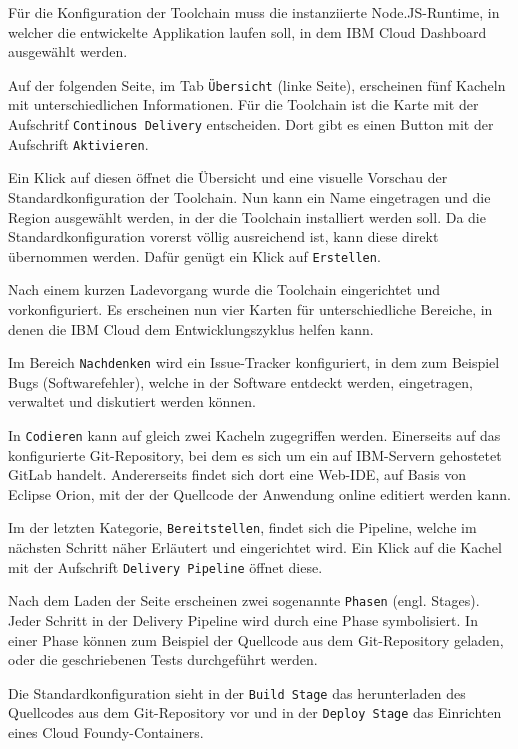 Für die Konfiguration der Toolchain muss die instanziierte Node.JS-Runtime, in welcher die entwickelte Applikation laufen
soll, in dem IBM Cloud Dashboard ausgewählt werden.

Auf der folgenden Seite, im Tab \texttt{Übersicht} (linke Seite), erscheinen fünf Kacheln mit unterschiedlichen Informationen.
Für die Toolchain ist die Karte mit der Aufschritf \texttt{Continous Delivery} entscheiden. Dort gibt es einen Button
mit der Aufschrift \texttt{Aktivieren}.

Ein Klick auf diesen öffnet die Übersicht und eine visuelle Vorschau der Standardkonfiguration der Toolchain. Nun kann ein
Name eingetragen und die Region ausgewählt werden, in der die Toolchain installiert werden soll. Da die Standardkonfiguration
vorerst völlig ausreichend ist, kann diese direkt übernommen werden. Dafür genügt ein Klick auf \texttt{Erstellen}.

Nach einem kurzen Ladevorgang wurde die Toolchain eingerichtet und vorkonfiguriert. Es erscheinen nun vier Karten für
unterschiedliche Bereiche, in denen die IBM Cloud dem Entwicklungszyklus helfen kann.

Im Bereich \texttt{Nachdenken} wird ein Issue-Tracker konfiguriert, in dem zum Beispiel Bugs (Softwarefehler), welche
in der Software entdeckt werden, eingetragen, verwaltet und diskutiert werden können.

In \texttt{Codieren} kann auf gleich zwei Kacheln zugegriffen werden. Einerseits auf das konfigurierte Git-Repository,
bei dem es sich um ein auf IBM-Servern gehostetet GitLab handelt. Andererseits findet sich dort eine Web-IDE, auf Basis
von Eclipse Orion, mit der der Quellcode der Anwendung online editiert werden kann.

Im der letzten Kategorie, \texttt{Bereitstellen}, findet sich die Pipeline, welche im nächsten Schritt näher Erläutert
und eingerichtet wird. Ein Klick auf die Kachel mit der Aufschrift \texttt{Delivery Pipeline} öffnet diese.

Nach dem Laden der Seite erscheinen zwei sogenannte \texttt{Phasen} (engl. Stages). Jeder Schritt in der Delivery Pipeline
wird durch eine Phase symbolisiert. In einer Phase können zum Beispiel der Quellcode aus dem Git-Repository geladen, oder
die geschriebenen Tests durchgeführt werden.

Die Standardkonfiguration sieht in der \texttt{Build Stage} das herunterladen des Quellcodes aus dem Git-Repository vor
und in der \texttt{Deploy Stage} das Einrichten eines Cloud Foundy-Containers.


